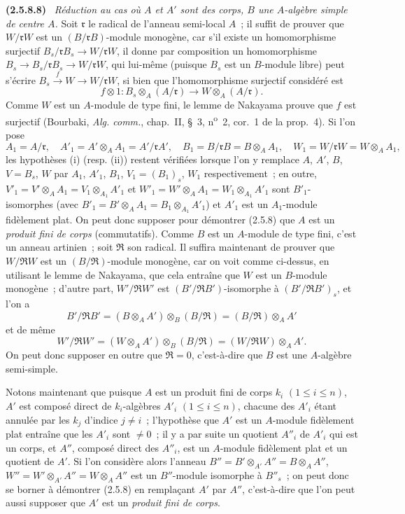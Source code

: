 \documentclass[10pt,oneside]{book}
\newenvironment{env}[1][]{\par\medskip\noindent\textbf{(#1)}\ }{\par}
\begin{document}
\begin{env}[2.5.8.8]
\label{IV.2.5.8.8-fr}
\emph{Réduction au cas où $A$ et $A'$ sont des corps, $B$ une $A$-algèbre
simple de centre $A$.} Soit $\mathfrak r$ le radical de l'anneau semi-local
$A$~; il suffit de prouver que $W/\mathfrak rW$ est un
$(B/\mathfrak rB)$-module monogène, car s'il existe un homomorphisme surjectif
$B_s/\mathfrak rB_s\to W/\mathfrak rW$, il donne par composition un
homomorphisme $B_s\to B_s/\mathfrak rB_s\to W/\mathfrak rW$, qui lui-même
(puisque $B_s$ est un $B$-module libre) peut s'écrire
$B_s\xrightarrow{f}W\to W/\mathfrak rW$, si bien que l'homomorphisme
surjectif considéré est
\[
f\otimes1:B_s\otimes_A(A/\mathfrak r)\longrightarrow
W\otimes_A(A/\mathfrak r).
\]
Comme $W$ est un $A$-module de type fini, le lemme de Nakayama prouve que
$f$ est surjectif (Bourbaki, \emph{Alg. comm.}, chap.~II, \S~3,
n\textsuperscript{o}~2, cor.~1 de la prop.~4). Si l'on pose
\[
A_1=A/\mathfrak r,\quad A'_1=A'\otimes_A A_1=A'/\mathfrak rA',\quad
B_1=B/\mathfrak rB=B\otimes_A A_1,\quad
W_1=W/\mathfrak rW=W\otimes_A A_1,
\]
les hypothèses (i) (resp. (ii)) restent vérifiées lorsque l'on y remplace
$A$, $A'$, $B$, $V=B_s$, $W$ par $A_1$, $A'_1$, $B_1$,
$V_1=(B_1)_s$, $W_1$ respectivement~; en outre,
$V'_1=V'\otimes_A A_1=V_1\otimes_{A_1}A'_1$ et
$W'_1=W'\otimes_A A_1=W_1\otimes_{A_1}A'_1$ sont $B'_1$-isomorphes (avec
$B'_1=B'\otimes_A A_1=B_1\otimes_{A_1}A'_1$) et $A'_1$ est un $A_1$-module
fidèlement plat. On peut donc supposer pour démontrer (2.5.8) que $A$ est un
\emph{produit fini de corps} (commutatifs). Comme $B$ est un $A$-module de
type fini, c'est un anneau artinien~; soit $\mathfrak R$ son radical. Il
suffira maintenant de prouver que $W/\mathfrak RW$ est un
$(B/\mathfrak R)$-module monogène, car on voit comme ci-dessus, en utilisant
le lemme de Nakayama, que cela entraîne que $W$ est un $B$-module monogène~;
d'autre part, $W'/\mathfrak RW'$ est $(B'/\mathfrak RB')$-isomorphe à
$(B'/\mathfrak RB')_s$, et l'on a
\[
B'/\mathfrak RB'=(B\otimes_A A')\otimes_B(B/\mathfrak R)
=(B/\mathfrak R)\otimes_A A'
\]
et de même
\[
W'/\mathfrak RW'=(W\otimes_A A')\otimes_B(B/\mathfrak R)
=(W/\mathfrak RW)\otimes_A A'.
\]
On peut donc supposer en outre que $\mathfrak R=0$, c'est-à-dire que $B$ est
une $A$-algèbre semi-simple.

Notons maintenant que puisque $A$ est un produit fini de corps $k_i$
$(1\leq i\leq n)$, $A'$ est composé direct de $k_i$-algèbres $A'_i$
$(1\leq i\leq n)$, chacune des $A'_i$ étant annulée par les $k_j$ d'indice
$j\ne i$~; l'hypothèse que $A'$ est un $A$-module fidèlement plat entraîne
que les $A'_i$ sont $\ne0$~; il y a par suite un quotient $A''_i$ de $A'_i$
qui est un corps, et $A''$, composé direct des $A''_i$, est un $A$-module
fidèlement plat et un quotient de $A'$. Si l'on considère alors l'anneau
$B''=B'\otimes_{A'}A''=B\otimes_A A''$,
$W''=W'\otimes_{A'}A''=W\otimes_A A''$ est un $B''$-module isomorphe à
$B''_s$~; on peut donc se borner à démontrer (2.5.8) en remplaçant $A'$ par
$A''$, c'est-à-dire que l'on peut aussi supposer que $A'$ est un \emph{produit
fini de corps}.


\end{env}
\end{document}
